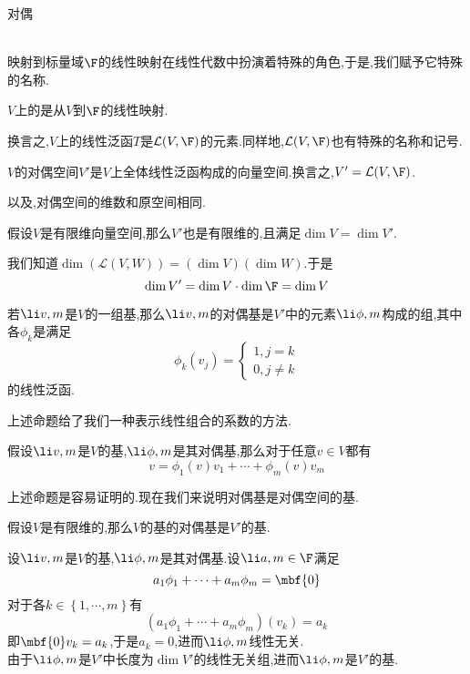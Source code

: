 \documentclass{ctexart}
\begin{document}
\pagestyle{empty}
\begin{center}\large 对偶\end{center}
\\
映射到标量域$\F$的线性映射在线性代数中扮演着特殊的角色,于是,我们赋予它特殊的名称.
\begin{definition}[1.1 定义:线性泛函]
    $V$上的是从$V$到$\F$的线性映射.
\end{definition}\noindent
换言之,$V$上的线性泛函$T$是$\mathcal{L}(V,\F)$的元素.同样地,$\mathcal{L}(V,\F)$也有特殊的名称和记号.
\begin{definition}[1.2 定义:对偶空间]
    $V$的对偶空间$V'$是$V$上全体线性泛函构成的向量空间.换言之,$V'=\mathcal{L}(V,\F)$.
\end{definition}\noindent
以及,对偶空间的维数和原空间相同.
\begin{formal}[1.3 对偶空间的维数]
    假设$V$是有限维向量空间,那么$V'$也是有限维的,且满足$\dim V=\dim V'$.
\end{formal}
\begin{solution}[Proof.]
    我们知道$\dim\left(\mathcal{L}(V,W)\right)=\left(\dim V\right)\left(\dim W\right)$.于是
    $$\dim V'=\dim V\cdot\dim\F=\dim V$$
\end{solution}
\begin{definition}[1.4 定义:对偶基]
    若$\li v,m$是$V$的一组基,那么$\li v,m$的对偶基是$V'$中的元素$\li\phi,m$构成的组,其中各$\phi_k$是满足
    $$\phi_k(v_j)=\left\{\begin{array}{l}
        1,j=k\\0,j\neq k
    \end{array}\right.$$
    的线性泛函.
\end{definition}\noindent
上述命题给了我们一种表示线性组合的系数的方法.
\begin{formal}[1.5 对偶基和线性组合的系数]
    假设$\li v,m$是$V$的基,$\li\phi,m$是其对偶基,那么对于任意$v\in V$都有
    $$v=\phi_1(v)v_1+\cdots+\phi_m(v)v_m$$
\end{formal}\noindent
上述命题是容易证明的.现在我们来说明对偶基是对偶空间的基.
\begin{formal}[1.6 对偶基是对偶空间的基]
    假设$V$是有限维的,那么$V$的基的对偶基是$V'$的基.
\end{formal}
\begin{solution}[Proof.]
    设$\li v,m$是$V$的基,$\li\phi,m$是其对偶基.设$\li a,m\in\F$满足
    $$a_1\phi_1+\cdots+a_m\phi_m=\mbf{0}$$
    对于各$k\in\left\{1,\cdots,m\right\}$有$$\left(a_1\phi_1+\cdots+a_m\phi_m\right)(v_k)=a_k$$
    即$\mbf{0}v_k=a_k$,于是$a_k=0$,进而$\li\phi,m$线性无关.\\
    由于$\li\phi,m$是$V'$中长度为$\dim V'$的线性无关组,进而$\li\phi,m$是$V'$的基.
\end{solution}
\end{document}
